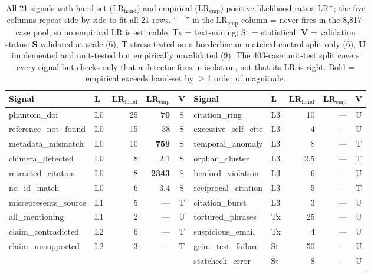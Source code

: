 \documentclass[runningheads]{llncs}
\begin{document}
\begin{table}[!tb]
\centering
\scriptsize
\renewcommand{\arraystretch}{0.95}
\setlength{\tabcolsep}{3pt}
\begin{tabular}{@{}llrrc@{\hspace{1.2em}}llrrc@{}}
\toprule
\textbf{Signal} & \textbf{L} & \textbf{LR$_{\text{hand}}$} & \textbf{LR$_{\text{emp}}$} & \textbf{V}
& \textbf{Signal} & \textbf{L} & \textbf{LR$_{\text{hand}}$} & \textbf{LR$_{\text{emp}}$} & \textbf{V} \\
\midrule
phantom\_doi          & L0 & 25 & \textbf{70}   & S & citation\_ring        & L3 & 10  & --- & U \\
reference\_not\_found & L0 & 15 & 38            & S & excessive\_self\_cite & L3 & 4   & --- & U \\
metadata\_mismatch    & L0 & 10 & \textbf{759}  & S & temporal\_anomaly     & L3 & 8   & --- & T \\
chimera\_detected     & L0 & 8  & 2.1           & S & orphan\_cluster       & L3 & 2.5 & --- & T \\
retracted\_citation   & L0 & 8  & \textbf{2343} & S & benford\_violation    & L3 & 6   & --- & U \\
no\_id\_match         & L0 & 6  & 3.4           & S & reciprocal\_citation  & L3 & 5   & --- & T \\
misrepresents\_source & L1 & 5  & ---           & T & citation\_burst       & L3 & 3   & --- & U \\
all\_mentioning       & L1 & 2  & ---           & U & tortured\_phrases     & Tx & 25  & --- & U \\
claim\_contradicted   & L2 & 6  & ---           & T & suspicious\_email     & Tx & 4   & --- & U \\
claim\_unsupported    & L2 & 3  & ---           & T & grim\_test\_failure   & St & 50  & --- & U \\
                      &    &    &               &   & statcheck\_error      & St & 8   & --- & U \\
\bottomrule
\end{tabular}
\caption{All 21 signals with hand-set (LR$_{\text{hand}}$) and empirical (LR$_{\text{emp}}$) positive likelihood ratios LR$^{+}$; the five columns repeat side by side to fit all 21 rows. ``---'' in the LR$_{\text{emp}}$ column = never fires in the 8{,}817-case pool, so no empirical LR is estimable. Tx = text-mining; St = statistical. \textbf{V} = validation status: \textbf{S} validated at scale (6), \textbf{T} stress-tested on a borderline or matched-control split only (6), \textbf{U} implemented and unit-tested but empirically unvalidated (9). The 403-case unit-test split covers every signal but checks only that a detector fires in isolation, not that its LR is right. Bold = empirical exceeds hand-set by $\geq$1 order of magnitude.}
\label{tab:lrs}
\end{table}
\end{document}
